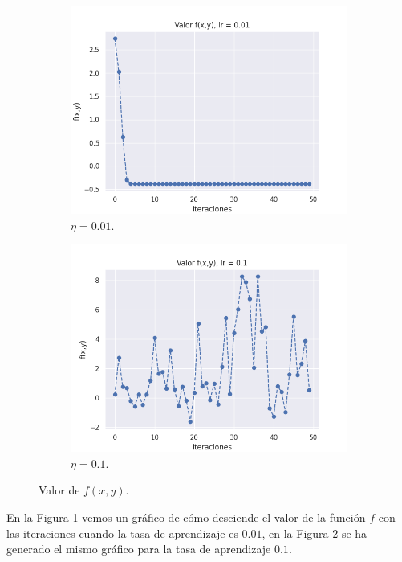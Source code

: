 \documentclass[a4paper, 20pt]{article}
\begin{document}
\begin{figure}[H]
\centering
\begin{subfigure}{0.5\textwidth}
  \centering
  \includegraphics[width=1\linewidth]{1lr0_01}
  \caption{$\eta = 0.01$.}
  \label{fig:0.01}
\end{subfigure}%
\begin{subfigure}{.5\textwidth}
  \centering
  \includegraphics[width=1\linewidth]{1lr0_1}
  \caption{$\eta = 0.1$.}
  \label{fig:0.1}
\end{subfigure}
\caption{Valor de $f(x,y)$.}
\label{fig:test}
\end{figure}

En la Figura \ref{fig:0.01} vemos un gráfico de cómo desciende el valor de la función $f$ con las iteraciones cuando la tasa de aprendizaje es $0.01$, en la Figura \ref{fig:0.1} se ha generado el mismo gráfico para la tasa de aprendizaje $0.1$.
\end{document}
